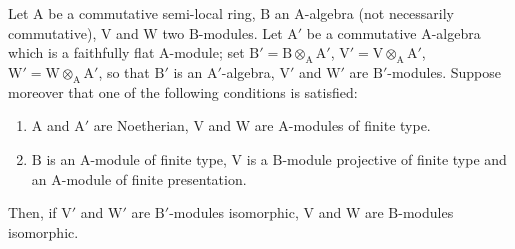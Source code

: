 \begin{proposition}[2.5.8]
\label{IV.2.5.8}
Let $\mathrm{A}$ be a commutative semi-local ring, $\mathrm{B}$ an $\mathrm{A}$-algebra \textnormal{(}not necessarily commutative\textnormal{)},
$\mathrm{V}$ and $\mathrm{W}$ two $\mathrm{B}$-modules. Let $\mathrm{A}'$ be a commutative $\mathrm{A}$-algebra which is a faithfully flat $\mathrm{A}$-module; set $\mathrm{B}'=\mathrm{B}\otimes_{\mathrm{A}}\mathrm{A}'$,
$\mathrm{V}'=\mathrm{V}\otimes_{\mathrm{A}}\mathrm{A}'$, $\mathrm{W}'=\mathrm{W}\otimes_{\mathrm{A}}\mathrm{A}'$, so that $\mathrm{B}'$ is an $\mathrm{A}'$-algebra, $\mathrm{V}'$ and $\mathrm{W}'$ are $\mathrm{B}'$-modules. Suppose moreover that one of the
following conditions is satisfied:
\begin{enumerate}[label=(\roman*)]
  \item $\mathrm{A}$ and $\mathrm{A}'$ are Noetherian, $\mathrm{V}$ and $\mathrm{W}$ are $\mathrm{A}$-modules of finite type.
  \item $\mathrm{B}$ is an $\mathrm{A}$-module of finite type, $\mathrm{V}$ is a $\mathrm{B}$-module projective of finite type and an $\mathrm{A}$-module of finite presentation.
\end{enumerate}
Then, if $\mathrm{V}'$ and $\mathrm{W}'$ are $\mathrm{B}'$-modules isomorphic, $\mathrm{V}$ and $\mathrm{W}$ are $\mathrm{B}$-modules isomorphic.
\end{proposition}

